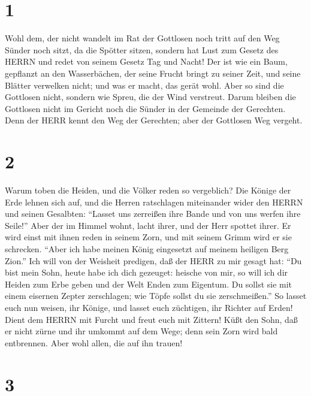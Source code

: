 \hypertarget{section}{%
\section{1}\label{section}}

 Wohl dem, der nicht wandelt im Rat der Gottlosen noch tritt
auf den Weg Sünder noch sitzt, da die Spötter sitzen, 
sondern hat Lust zum Gesetz des HERRN und redet von seinem Gesetz Tag
und Nacht!  Der ist wie ein Baum, gepflanzt an den
Wasserbächen, der seine Frucht bringt zu seiner Zeit, und seine Blätter
verwelken nicht; und was er macht, das gerät wohl.  Aber so
sind die Gottlosen nicht, sondern wie Spreu, die der Wind verstreut.
 Darum bleiben die Gottlosen nicht im Gericht noch die
Sünder in der Gemeinde der Gerechten.  Denn der HERR kennt
den Weg der Gerechten; aber der Gottlosen Weg vergeht.

\hypertarget{section-1}{%
\section{2}\label{section-1}}

 Warum toben die Heiden, und die Völker reden so vergeblich?
 Die Könige der Erde lehnen sich auf, und die Herren
ratschlagen miteinander wider den HERRN und seinen Gesalbten:
 ``Lasset uns zerreißen ihre Bande und von uns werfen ihre
Seile!''  Aber der im Himmel wohnt, lacht ihrer, und der
Herr spottet ihrer.  Er wird einst mit ihnen reden in seinem
Zorn, und mit seinem Grimm wird er sie schrecken.  ``Aber
ich habe meinen König eingesetzt auf meinem heiligen Berg Zion.''
 Ich will von der Weisheit predigen, daß der HERR zu mir
gesagt hat: ``Du bist mein Sohn, heute habe ich dich gezeuget:
 heische von mir, so will ich dir Heiden zum Erbe geben und
der Welt Enden zum Eigentum.  Du sollst sie mit einem
eisernen Zepter zerschlagen; wie Töpfe sollst du sie zerschmeißen.''
 So lasset euch nun weisen, ihr Könige, und lasset euch
züchtigen, ihr Richter auf Erden!  Dient dem HERRN mit
Furcht und freut euch mit Zittern!  Küßt den Sohn, daß er
nicht zürne und ihr umkommt auf dem Wege; denn sein Zorn wird bald
entbrennen. Aber wohl allen, die auf ihn trauen!

\hypertarget{section-2}{%
\section{3}\label{section-2}}

